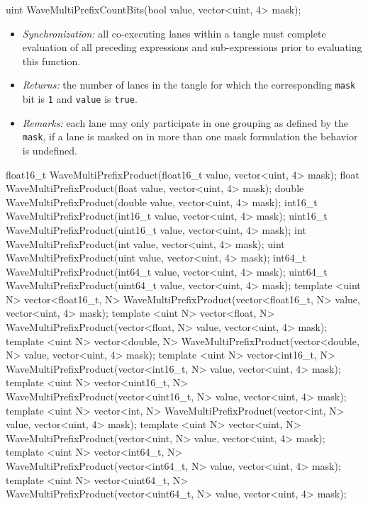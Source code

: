 \begin{HLSL}
uint WaveMultiPrefixCountBits(bool value, vector<uint, 4> mask);
\end{HLSL}

\begin{itemize}
  \item \textit{Synchronization:} all co-executing \gls{lane}s within a \gls{tangle}
  must complete evaluation of all preceding expressions and sub-expressions
  prior to evaluating this function.
  \item \textit{Returns:} the number of \gls{lane}s in the \gls{tangle} for
  which the corresponding \texttt{mask} bit is \texttt{1} and \texttt{value} is
  \texttt{true}.
  \item \textit{Remarks:} each \gls{lane} may only participate in one grouping
  as defined by the \texttt{mask}, if a \gls{lane} is masked on in more than one
  mask formulation the behavior is undefined.
\end{itemize}

\begin{HLSL}
float16_t WaveMultiPrefixProduct(float16_t value, vector<uint, 4> mask);
float WaveMultiPrefixProduct(float value, vector<uint, 4> mask);
double WaveMultiPrefixProduct(double value, vector<uint, 4> mask);
int16_t WaveMultiPrefixProduct(int16_t value, vector<uint, 4> mask);
uint16_t WaveMultiPrefixProduct(uint16_t value, vector<uint, 4> mask);
int WaveMultiPrefixProduct(int value, vector<uint, 4> mask);
uint WaveMultiPrefixProduct(uint value, vector<uint, 4> mask);
int64_t WaveMultiPrefixProduct(int64_t value, vector<uint, 4> mask);
uint64_t WaveMultiPrefixProduct(uint64_t value, vector<uint, 4> mask);
template <uint N>
vector<float16_t, N> WaveMultiPrefixProduct(vector<float16_t, N> value, vector<uint, 4> mask);
template <uint N>
vector<float, N> WaveMultiPrefixProduct(vector<float, N> value, vector<uint, 4> mask);
template <uint N>
vector<double, N> WaveMultiPrefixProduct(vector<double, N> value, vector<uint, 4> mask);
template <uint N>
vector<int16_t, N> WaveMultiPrefixProduct(vector<int16_t, N> value, vector<uint, 4> mask);
template <uint N>
vector<uint16_t, N> WaveMultiPrefixProduct(vector<uint16_t, N> value, vector<uint, 4> mask);
template <uint N>
vector<int, N> WaveMultiPrefixProduct(vector<int, N> value, vector<uint, 4> mask);
template <uint N>
vector<uint, N> WaveMultiPrefixProduct(vector<uint, N> value, vector<uint, 4> mask);
template <uint N>
vector<int64_t, N> WaveMultiPrefixProduct(vector<int64_t, N> value, vector<uint, 4> mask);
template <uint N>
vector<uint64_t, N> WaveMultiPrefixProduct(vector<uint64_t, N> value, vector<uint, 4> mask);
\end{HLSL}

